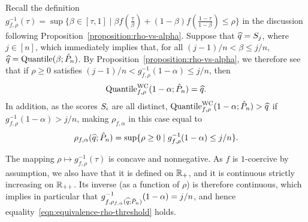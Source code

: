 Recall the definition $g_{f,\rho}^{-1}(\tau) = \sup\{\beta \in [\tau, 1]
\mid \beta f(\frac{\tau}{\beta}) + (1 - \beta) f(\frac{1 - \tau}{1 -
  \beta}) \le \rho\}$ in the discussion following
Proposition~\ref{proposition:rho-vs-alpha}.  Suppose that $\widehat{q} =
S_j$, where $j \in [n]$, which immediately implies that, for all
$(j - 1) / n < \beta \le j / n$, $\widehat{q} = \textup{Quantile}(\beta; \hat{P}_n)$. By
Proposition~\ref{proposition:rho-vs-alpha}, we therefore see that if $\rho
\ge 0$ satisfies $(j - 1) / n <
g_{f,\rho}^{-1}(1-\alpha) \le j / n$,
then
\begin{align*}
  \textup{Quantile}^{\textup{WC}}_{f, \rho}(1-\alpha; \hat P_n) = \widehat{q}.
\end{align*}
In addition, as the scores $S_i$ are all distinct, $\textup{Quantile}^{\textup{WC}}_{f,
  \rho}(1-\alpha; \hat P_n) > \widehat{q}$ if $g_{f,\rho}^{-1}(1-\alpha) >
j / n$, making $\rho_{f,\alpha}$ in this case equal to
\begin{align*}
  \rho_{f,\alpha}(\widehat{q} ; \hat{P}_n)
  = \sup\{ \rho \ge 0 \mid g_{f,\rho}^{-1}(1-\alpha) \le j/n \}.
\end{align*}

The mapping $\rho \mapsto g_{f,\rho}^{-1}(\tau)$ is concave and
nonnegative.  As $f$ is $1$-coercive by assumption, we also have that it
is defined on $\mathbb{R}_+$, and it is continuous strictly increasing on
$\mathbb{R}_{++}$.  Its inverse (as a function of $\rho$) is therefore continuous,
which implies in particular that $g_{f,\rho_{f,\alpha}(\widehat{q}
  ;\hat{P}_n)}^{-1}(1-\alpha) = j/n$, and hence
equality~\eqref{eqn:equivalence-rho-threshold} holds.


